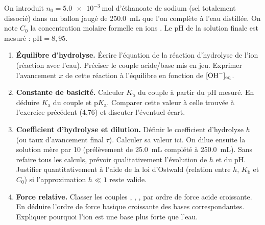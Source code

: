 \documentclass[11pt]{article}
\begin{document}
\begin{exercice}
On introduit $n_0 = \SI{5,0e-3}{\mole}$ d'éthanoate de sodium  (sel totalement dissocié) dans un ballon jaugé de \SI{250,0}{\milli\liter} que l'on complète à l'eau distillée. On note $C_0$ la concentration molaire formelle en ions . Le pH de la solution finale est mesuré : $\mathrm{pH} = 8,95$.

\begin{enumerate}
    \item \textbf{Équilibre d'hydrolyse.} Écrire l'équation de la réaction d'hydrolyse de l'ion  (réaction avec l'eau). Préciser le couple acide/base mis en jeu. Exprimer l'avancement $x$ de cette réaction à l'équilibre en fonction de $[\ce{OH-}]_{\mathrm{eq}}$.
    \item \textbf{Constante de basicité.} Calculer $K_{\mathrm{b}}$ du couple  à partir du pH mesuré. En déduire $K_{\mathrm{a}}$ du couple  et $\mathrm{p}K_{\mathrm{a}}$. Comparer cette valeur à celle trouvée à l'exercice précédent (4,76) et discuter l'éventuel écart.
    \item \textbf{Coefficient d'hydrolyse et dilution.} Définir le coefficient d'hydrolyse $h$ (ou taux d'avancement final $\tau$). Calculer sa valeur ici. 
    On dilue ensuite la solution mère par 10 (prélèvement de \SI{25,0}{\milli\liter} complété à \SI{250,0}{\milli\liter}). Sans refaire tous les calculs, prévoir qualitativement l'évolution de $h$ et du pH. Justifier quantitativement à l'aide de la loi d'Ostwald (relation entre $h$, $K_{\mathrm{b}}$ et $C_0$) si l'approximation $h \ll 1$ reste valide.
    \item \textbf{Force relative.} Classer les couples , , ,  par ordre de force acide croissante. En déduire l'ordre de force basique croissante des bases correspondantes. Expliquer pourquoi l'ion  est une base plus forte que l'eau.
\end{enumerate}
\end{exercice}
\end{document}
